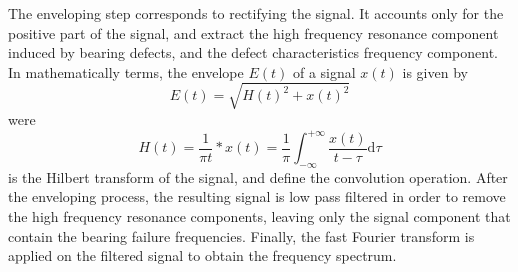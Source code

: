 \documentclass[../Main/thesis.tex]{subfiles}
\begin{document}
\justify
The enveloping step corresponds to rectifying the signal. It accounts only for the positive part of the signal, and extract the high frequency resonance component induced by bearing defects, and the defect characteristics frequency component.
\justify
In mathematically terms, the envelope  $E(t)$ of a signal $x(t)$ is given by
\begin{equation}
E(t) = \sqrt{H(t)^{2}+ x(t)^{2}}
\end{equation}
were 
\begin{equation}
H(t) = \frac{1}{\pi t}*x(t) = \frac{1}{\pi}\int_{-\infty}^{+\infty}\frac{x(t)}{t-\tau}\mathrm{d}\tau
\end{equation}
is the Hilbert transform of the signal, and \say{*} define the convolution operation.
 After the enveloping process, the resulting signal is low pass filtered in order to remove the high frequency resonance components, leaving only the signal component that contain the bearing failure frequencies. Finally, the fast Fourier transform is applied on the filtered signal to obtain the frequency spectrum.
\end{document}
